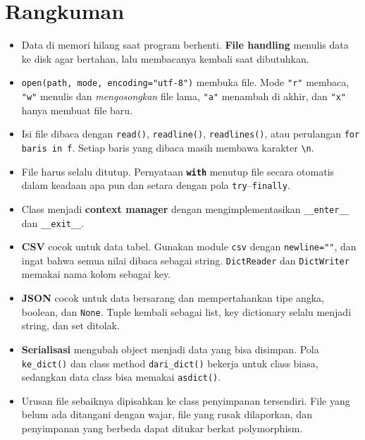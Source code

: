 \section{Rangkuman}

\begin{itemize}
  \item Data di memori hilang saat program berhenti. \textbf{File handling} menulis data ke disk agar bertahan, lalu membacanya kembali saat dibutuhkan.
  \item \texttt{open(path, mode, encoding="utf-8")} membuka file. Mode \texttt{"r"} membaca, \texttt{"w"} menulis dan \emph{mengosongkan} file lama, \texttt{"a"} menambah di akhir, dan \texttt{"x"} hanya membuat file baru.
  \item Isi file dibaca dengan \texttt{read()}, \texttt{readline()}, \texttt{readlines()}, atau perulangan \texttt{for baris in f}. Setiap baris yang dibaca masih membawa karakter \texttt{\textbackslash n}.
  \item File harus selalu ditutup. Pernyataan \textbf{\texttt{with}} menutup file secara otomatis dalam keadaan apa pun dan setara dengan pola \texttt{try}--\texttt{finally}.
  \item Class menjadi \textbf{context manager} dengan mengimplementasikan \texttt{\_\_enter\_\_} dan \texttt{\_\_exit\_\_}.
  \item \textbf{CSV} cocok untuk data tabel. Gunakan module \texttt{csv} dengan \texttt{newline=""}, dan ingat bahwa semua nilai dibaca sebagai string. \texttt{DictReader} dan \texttt{DictWriter} memakai nama kolom sebagai key.
  \item \textbf{JSON} cocok untuk data bersarang dan mempertahankan tipe angka, boolean, dan \texttt{None}. Tuple kembali sebagai list, key dictionary selalu menjadi string, dan set ditolak.
  \item \textbf{Serialisasi} mengubah object menjadi data yang bisa disimpan. Pola \texttt{ke\_dict()} dan class method \texttt{dari\_dict()} bekerja untuk class biasa, sedangkan data class bisa memakai \texttt{asdict()}.
  \item Urusan file sebaiknya dipisahkan ke class penyimpanan tersendiri. File yang belum ada ditangani dengan wajar, file yang rusak dilaporkan, dan penyimpanan yang berbeda dapat ditukar berkat polymorphism.
\end{itemize}

